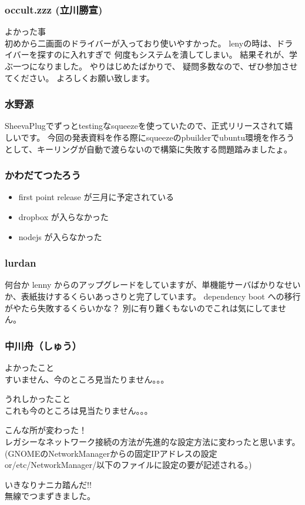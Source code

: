 \documentclass[cjk,dvipdfmx,12pt,%
hyperref={bookmarks=true,bookmarksnumbered=true,bookmarksopen=false,%
colorlinks=false,%
pdftitle={第 44 回 関西 Debian 勉強会},%
pdfauthor={倉敷・のがた・佐々木},%
pdfsubject={資料},%
}]{beamer}
\begin{document}
\begin{frame}[fragile]
  \frametitle{ occult.zzz (立川勝宣) }
  \begin{description}
  \item {よかった事} \\
    初めから二画面のドライバーが入っており使いやすかった。
    lenyの時は、ドライバーを探すのに入れすぎで
    何度もシステムを潰してしまい。
    結果それが、学ぶ一つになりました。
    やりはじめたばかりで、
    疑問多数なので、ぜひ参加させてください。
    よろしくお願い致します。
  \end{description}
\end{frame}
\begin{frame}[fragile]
  \frametitle{ 水野源 }
  SheevaPlugでずっとtestingなsqueezeを使っていたので、正式リリースされて嬉しいです。
  今回の発表資料を作る際にsqueezeのpbuilderでubuntu環境を作ろうとして、キーリングが自動で渡らないので構築に失敗する問題踏みましたょ。
\end{frame}

\begin{frame}[fragile]
  \frametitle{ かわだてつたろう }
  \begin{itemize}
  \item first point release が三月に予定されている
  \item dropbox が入らなかった
  \item nodejs が入らなかった
  \end{itemize}
\end{frame}

\begin{frame}[fragile]
  \frametitle{ lurdan }
  何台か lenny からのアップグレードをしていますが、単機能サーバばかりなせいか、表紙抜けするくらいあっさりと完了しています。
  dependency boot への移行がやたら失敗するくらいかな？ 別に有り難くもないのでこれは気にしてません。
\end{frame}

\begin{frame}[fragile]
  \frametitle{ 中川舟（しゅう） }
  \begin{description}
  \item {よかったこと} \\
    すいません、今のところ見当たりません。。。
  \item {うれしかったこと}　\\
    これも今のところは見当たりません。。。
  \item {こんな所が変わった！} \\
    レガシーなネットワーク接続の方法が先進的な設定方法に変わったと思います。(GNOMEのNetworkManagerからの固定IPアドレスの設定or/etc/NetworkManager/以下のファイルに設定の要が記述される。)
  \item {いきなりナニカ踏んだ!!} \\
    無線でつまずきました。
  \end{description}
\end{frame}
\end{document}
